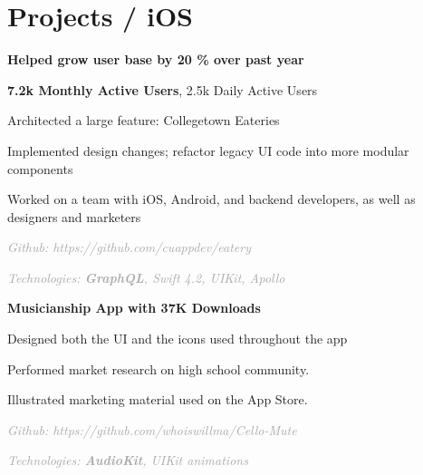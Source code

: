 \documentclass[]{deedy-resume-openfont}
\let\sectionold\section
\renewcommand{\section}[1]{
	\sectionold{\textcolor{sectiontitlecolor}{#1}}
}
\begin{document}
\begin{minipage}[t]{0.66\textwidth} 


\section{Projects / iOS}

\vspace{\topsep} %
\begin{tightemize}
\item \textbf{Helped grow user base by 20 \% over past year}
\item \textbf{7.2k Monthly Active Users}, 2.5k Daily Active Users
\item Architected a large feature: Collegetown Eateries
\item Implemented design changes; refactor legacy UI code into more modular components
\item Worked on a team with iOS, Android, and backend developers, as well as designers and marketers
\\
\item \textcolor{darkgray}{\textit{Github: https://github.com/cuappdev/eatery}}  \\
\item \textcolor{darkgray}{\textit{Technologies: \textbf{GraphQL}, Swift 4.2, UIKit, Apollo}} 
\end{tightemize}
\sectionsep

\begin{tightemize}
\item \textbf{Musicianship App with 37K Downloads}
\item Designed both the UI and the icons used throughout the app
\item Performed market research on high school community.
\item Illustrated marketing material used on the App Store.
\\
\item \textcolor{darkgray}{\textit{Github: https://github.com/whoiswillma/Cello-Mute}} 
\item \textcolor{darkgray}{\textit{Technologies: \textbf{AudioKit}, UIKit animations}} 
\end{tightemize}
\sectionsep


\end{minipage}
\end{document}

